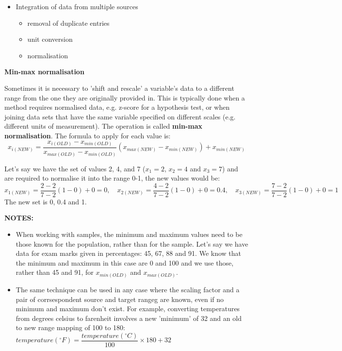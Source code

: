 \begin{itemize}
\item Integration of data from multiple sources

\begin{itemize}
\item removal of duplicate entries
\item unit conversion
\item normalisation
\end{itemize}
\end{itemize}
\begin{howto}
  {\textbf{Min-max normalisation}}
  {Sometimes it is necessary to 'shift and rescale' a variable's data to a different range from the one they are originally provided in. This is typically done when a method requires normalised data, e.g. z-score for a hypothesis test, or when joining data sets that have the same variable specified on different scales (e.g. different units of measurement). The operation is called \textbf{min-max normalisation}. The formula to apply for each value is:
    $$x_{i(NEW)} = \dfrac{x_{i(OLD)} - x_{min(OLD)}}{x_{max(OLD)} - x_{min(OLD)}}(x_{max(NEW)} - x_{min(NEW)}) + x_{min(NEW)}$$

    \textbf{\color{darkgray}{Example:}}

    Let's say we have the set of values 2, 4, and 7 ($x_1=2$, $x_2=4$ and $x_3=7$) and are required to normalise it into the range 0-1, the new values would be:
    $$x_{1(NEW)} = \dfrac{2 - 2}{7 - 2}(1 - 0) + 0 = 0,\quad x_{2(NEW)} = \dfrac{4 - 2}{7 - 2}(1 - 0) + 0 = 0.4,\quad x_{3(NEW)} = \dfrac{7 - 2}{7 - 2}(1 - 0) + 0 = 1$$
    The new set is 0, 0.4 and 1.
    
    \tiny{\textbf{NOTES:}
    \vspace{-2ex}  
    \begin{itemize}
    \item When working with samples, the minimum and maximum values need to be those known for the population, rather than for the sample. Let's say we have data for exam marks given in percentages: 45, 67, 88 and 91. We know that the minimum and maximum in this case are 0 and 100 and we use those, rather than 45 and 91, for $x_{min(OLD)}$ and $x_{max(OLD)}$.
    \item The same technique can be used in any case where the scaling factor and a pair of corrsespondent source and target rangeg are known, even if no minimum and maximum don't exist. For example, converting temperatures from degrees celsius to farenheit involves a new 'minimum' of 32 and an old to new range mapping of 100 to 180: $temperature(^\circ F) = \dfrac{temperature(^\circ C)}{100}\times 180 + 32$
    \end{itemize}
    \vspace{0.5ex}
  }}{}{}
\end{howto}

